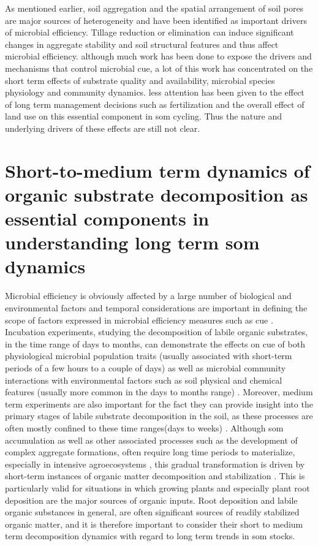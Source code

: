 \documentclass[12pt]{report}
\begin{document}
		As mentioned earlier, soil aggregation and the spatial arrangement of soil pores are major sources of heterogeneity and have been identified as important drivers of microbial efficiency\citep{kravchenko2019}.
		Tillage reduction or elimination can induce significant changes in aggregate stability and soil structural features \citep{alvaro-fuentes2009, barreto2009} and thus affect microbial efficiency.
		although much work has been done to expose the drivers and mechanisms that control microbial \gls{cue}, a lot of this work has concentrated on the short term effects of substrate quality and availability, microbial species physiology and community dynamics. less attention has been given to the effect of long term management decisions such as fertilization and the overall effect of land use on this essential component in \gls{som} cycling. Thus the nature and underlying drivers of these effects are still not clear.
		
		\section{Short-to-medium term dynamics of organic substrate decomposition as essential components in understanding long term \gls{som} dynamics}
		
		Microbial efficiency is obviously affected by a large number of biological and environmental factors and temporal considerations are important in defining the scope of factors expressed in microbial efficiency measures such as \gls{cue} \citep{kallenbach2019}. Incubation experiments, studying the decomposition of labile organic substrates, in the time range of days to months,  can demonstrate the effects on \gls{cue} of both physiological microbial population traits (usually associated with short-term periods of a few hours to a couple of days) as well as microbial community interactions with environmental factors such as soil physical and chemical features (usually more common in the days to months range) \citep{geyer2016, manzoni2018}. Moreover, medium term experiments are also important for the fact they can provide insight into the primary stages of labile substrate decomposition in the soil, as these processes are often mostly confined to these time ranges(days to weeks) \citep{blagodatskaya2011, schneckenberger2008, tian2015}. Although \gls{som} accumulation as well as other associated processes such as the development of complex aggregate formations, often require long time periods to materialize, especially in intensive agroecosystems \citep{grandy2007}, this gradual transformation is driven by short-term instances of organic matter decomposition and stabilization \citep{kuzyakov2015}. This is particularly valid for situations in which growing plants and especially plant root deposition are the major sources of organic inputs. Root deposition and labile organic substances in general, are often significant sources of readily stabilized organic matter, and it is therefore important to consider their short to medium term decomposition dynamics with regard to long term trends in \gls{som} stocks.
		
\end{document}
